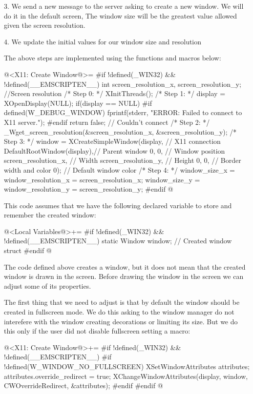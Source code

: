 3. We send a new message to the server asking to create a new
window. We will do it in the default screen, The window size will be
the greatest value allowed given the screen resolution.

4. We update the initial values for our window size and resolution

The above steps are implemented using the functions and macros below:

\iniciocodigo
@<X11: Create Window@>=
#if !defined(_WIN32) && !defined(__EMSCRIPTEN__)
int screen_resolution_x, screen_resolution_y; //Screen resolution
/* Step 0: */
XInitThreads();
/* Step 1: */
display = XOpenDisplay(NULL);
if(display == NULL){
#if defined(W_DEBUG_WINDOW)
  fprintf(stderr, "ERROR: Failed to connect to X11 server.\n");
#endif
  return false; // Couldn't connect
}
/* Step 2: */
_Wget_screen_resolution(&screen_resolution_x, &screen_resolution_y);
/* Step 3: */
window = XCreateSimpleWindow(display, // X11 connection
                             DefaultRootWindow(display),// Parent window
                             0, 0, // Window position
                             screen_resolution_x, // Width
                             screen_resolution_y, // Height
                             0, 0, // Border width and color
                             0); // Default window color
/* Step 4: */
window_size_x = window_resolution_x = screen_resolution_x;
window_size_y = window_resolution_y = screen_resolution_y;
#endif
@
\fimcodigo

This code assumes that we have the following declared variable to
store and remember the created window:

\iniciocodigo
@<Local Variables@>+=
#if !defined(_WIN32) && !defined(__EMSCRIPTEN__)
static Window window;    // Created window struct
#endif
@
\fimcodigo

The code defined above creates a window, but it does not mean that the
created window is drawn in the screen. Before drawing the window in
the screen we can adjust some of its properties.

The first thing that we need to adjust is that by default the window
should be created in fullscreen mode. We do this asking to the window
manager do not interefere with the window creating decorations or
limiting its size. But we do this only if the user did not disable
fullscreen setting a macro:

\iniciocodigo
@<X11: Create Window@>+=
#if !defined(_WIN32) && !defined(__EMSCRIPTEN__)
#if !defined(W_WINDOW_NO_FULLSCREEN)
{
  XSetWindowAttributes attributes;
  attributes.override_redirect = true;
  XChangeWindowAttributes(display, window, CWOverrideRedirect,
                          &attributes);
}
#endif
#endif
@
\fimcodigo


